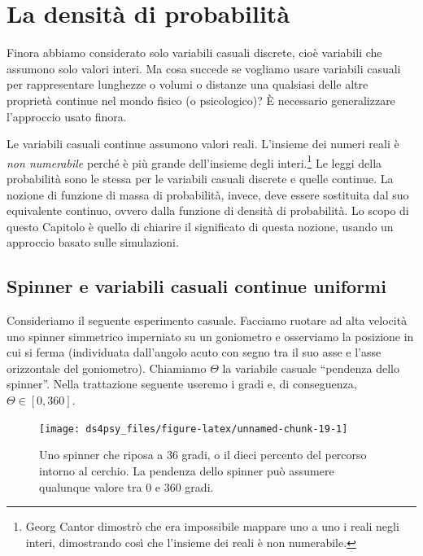 \documentclass[
  11pt,
]{krantz}
\theoremstyle{definition}
\theoremstyle{definition}
\theoremstyle{definition}
\theoremstyle{definition}
\theoremstyle{remark}
\begin{document}
\hypertarget{chapter-intro-density-function}{%
\chapter{La densità di probabilità}\label{chapter-intro-density-function}}

Finora abbiamo considerato solo variabili casuali discrete, cioè variabili che assumono solo valori interi. Ma cosa succede se vogliamo usare variabili casuali per rappresentare lunghezze o volumi o distanze una qualsiasi delle altre proprietà continue nel mondo fisico (o psicologico)? È necessario generalizzare l'approccio usato finora.

Le variabili casuali continue assumono valori reali. L'insieme dei numeri reali è \emph{non numerabile} perché è più grande dell'insieme degli interi.\footnote{Georg Cantor dimostrò che era impossibile mappare uno a uno i reali negli interi, dimostrando così che l'insieme dei reali è non numerabile.} Le leggi della probabilità sono le stessa per le variabili casuali discrete e quelle continue. La nozione di funzione di massa di probabilità, invece, deve essere sostituita dal suo equivalente continuo, ovvero dalla funzione di densità di probabilità. Lo scopo di questo Capitolo è quello di chiarire il significato di questa nozione, usando un approccio basato sulle simulazioni.

\hypertarget{spinner-e-variabili-casuali-continue-uniformi}{%
\section{Spinner e variabili casuali continue uniformi}\label{spinner-e-variabili-casuali-continue-uniformi}}

Consideriamo il seguente esperimento casuale. Facciamo ruotare ad alta velocità uno spinner simmetrico imperniato su un goniometro e osserviamo la posizione in cui si ferma (individuata dall'angolo acuto con segno tra il suo asse e l'asse orizzontale del goniometro). Chiamiamo \(\Theta\) la variabile casuale ``pendenza dello spinner''. Nella trattazione seguente useremo i gradi e, di conseguenza, \(\Theta \in [0, 360]\).

\begin{figure}

{\centering \texttt{[image: ds4psy\_files/figure-latex/unnamed-chunk-19-1]} 

}

\caption{Uno spinner che riposa a 36 gradi, o il dieci percento del percorso intorno al cerchio. La pendenza dello spinner può assumere qualunque valore tra 0 e 360 gradi.}\label{fig:unnamed-chunk-19}
\end{figure}
\end{document}
